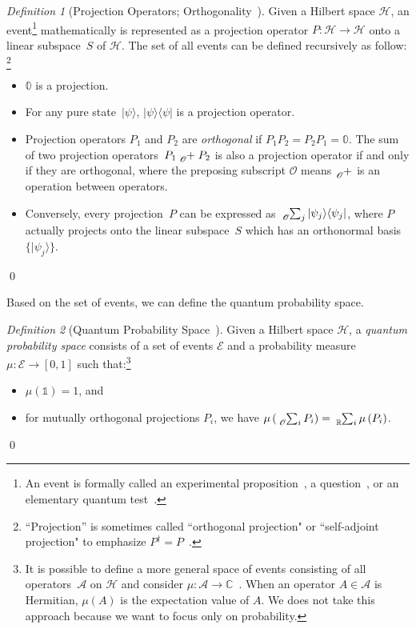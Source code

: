 \documentclass{article}
\theoremstyle{remark}
\newtheorem{definition}{Definition}
\newcommand{\events}{\ensuremath{\mathcal{E}}}
\newcommand{\Hilb}{\mathcal{H}}
\newcommand{\ket}[1]{|#1\rangle}
\newcommand{\proj}[1]{|#1 \rangle\langle #1 |}
\def\C{{\mathbb{C}}}
\begin{document}
\begin{definition}[Projection Operators;
Orthogonality~\cite{10.2307/2308516,Redhead1987-REDINA,peres1995quantum,Griffiths2003,Swart2013}]
\label{def:Projection} Given a Hilbert space $\Hilb$, an event\footnote{An event
is formally called an experimental proposition~\cite{BirkhoffVonNeumann1936}, a question~\cite{10.2307/2308516,DBLP:journals/corr/abs-0910-2393}, or an
elementary quantum test~\cite{peres1995quantum}.} mathematically is represented as a projection operator $P:\Hilb\rightarrow\Hilb$ onto a linear subspace~$S$ of $\Hilb$. The set of all events can be defined recursively as follow:
\footnote {``Projection'' is sometimes called
``orthogonal projection" or ``self-adjoint projection" to
emphasize $P^{\dagger} = P$~\cite{Griffiths2003,Maassen2010}.}
\begin{itemize}
\item $\mathbb{0}$ is a projection. 
\item For any pure state~$\ket{\psi}$, $\proj{\psi}$ is a projection
operator. 
\item Projection operators $P_1$ and $P_2$ are \emph{orthogonal} if $P_1P_2 =
  P_2P_1 = \mathbb{0}$. The sum of two projection operators~$P_{1}\tensor*[_{\mathscr{O}}]{+}{}P_{2}$
is also a projection operator if and only if they are orthogonal, 
where the preposing subscript $\mathscr{O}$
means $\tensor*[_{\mathscr{O}}]{+}{}$ is an operation between operators. 
\item Conversely, every projection~$P$ can be expressed as
$\tensor*[_{\mathscr{O}}]{\sum}{_j}\proj{\psi_{j}}$,
where $P$ actually projects onto the linear subspace~$S$ which
has an orthonormal basis~$\{\ket{\psi_{j}}\}$. 
\end{itemize}
\qed\end{definition}

Based on the set of events, we can define the quantum probability
space.

\begin{definition}[Quantum Probability
Space~\cite{10.2307/2308516,gleason1957,Redhead1987-REDINA,Maassen2010}]\label{def:QuantumProbabilitySpace}
  Given a Hilbert space $\Hilb$, a \emph{quantum probability space}
  consists of a set of events $\events$ and a probability measure
  $\mu : \events \rightarrow [0,1]$ such that:\footnote {It is
    possible to define a more general space of events consisting of
    all operators~$\mathcal{A}$ on $\Hilb$ and consider
    $\mu:\mathcal{A}\rightarrow\C$~\cite{Maassen2010,Swart2013}.  When
    an operator $A\in\mathcal{A}$ is Hermitian, $\mu\left(A\right)$ is
    the expectation value of $A$. We does not take this approach
    because we want to focus only on probability. }
\begin{itemize}
\item $\mu(\mathbb{1})=1$, and 
\item for mutually orthogonal projections $P_{i}$, we have 
$\mu\left(\tensor*[_{\mathscr{O}}]{\sum}{_{i}}P_{i}\right)=\tensor*[_{\mathbb{R}}]{\sum}{_{i}}\mu\left(P_{i}\right)$.
\end{itemize}
\qed\end{definition}
\end{document}
